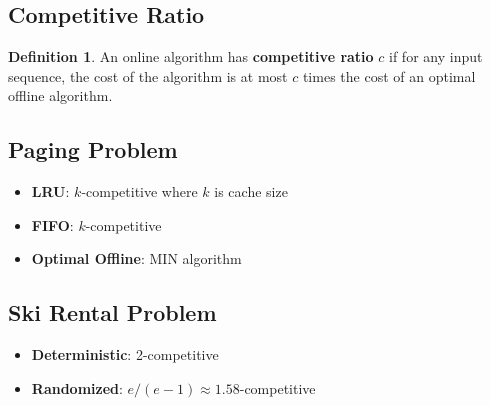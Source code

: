 \documentclass[11pt]{article}
\theoremstyle{definition}
\newtheorem{definition}{Definition}[section]
\begin{document}
\subsection{Competitive Ratio}
\begin{definition}
An online algorithm has \textbf{competitive ratio} $c$ if for any input sequence, the cost of the algorithm is at most $c$ times the cost of an optimal offline algorithm.
\end{definition}

\subsection{Paging Problem}
\begin{itemize}
    \item \textbf{LRU}: $k$-competitive where $k$ is cache size
    \item \textbf{FIFO}: $k$-competitive
    \item \textbf{Optimal Offline}: MIN algorithm
\end{itemize}

\subsection{Ski Rental Problem}
\begin{itemize}
    \item \textbf{Deterministic}: 2-competitive
    \item \textbf{Randomized}: $e/(e-1) \approx 1.58$-competitive
\end{itemize}
\end{document}
